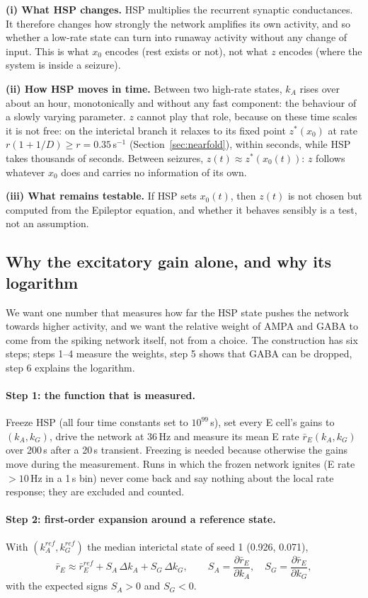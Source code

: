 \documentclass[11pt]{article}
\newcommand{\kA}{k_A}
\newcommand{\kG}{k_G}
\begin{document}
\textbf{(i) What HSP changes.} HSP multiplies the recurrent synaptic conductances. It therefore changes how strongly the
network amplifies its own activity, and so whether a low-rate state can turn into runaway activity without any change
of input. This is what $x_0$ encodes (rest exists or not), not what $z$ encodes (where the system is inside a seizure).

\textbf{(ii) How HSP moves in time.} Between two high-rate states, $\kA$ rises over about an hour, monotonically and
without any fast component: the behaviour of a slowly varying parameter. $z$ cannot play that role, because on these
time scales it is not free: on the interictal branch it relaxes to its fixed point $z^*(x_0)$ at rate $r(1+1/D)\ge r =
0.35$\,s$^{-1}$ (Section~\ref{sec:nearfold}), within seconds, while HSP takes thousands of seconds. Between seizures,
$z(t)\approx z^*(x_0(t))$: $z$ follows whatever $x_0$ does and carries no information of its own.

\textbf{(iii) What remains testable.} If HSP sets $x_0(t)$, then $z(t)$ is not chosen but computed from the Epileptor
equation, and whether it behaves sensibly is a test, not an assumption.

\subsection{Why the excitatory gain alone, and why its logarithm}\label{sec:Hderiv}
We want one number that measures how far the HSP state pushes the network towards higher activity, and we want the
relative weight of AMPA and GABA to come from the spiking network itself, not from a choice. The construction has six
steps; steps 1--4 measure the weights, step 5 shows that GABA can be dropped, step 6 explains the logarithm.

\paragraph{Step 1: the function that is measured.}
Freeze HSP (all four time constants set to $10^{99}$\,s), set every E cell's gains to $(\kA,\kG)$, drive the network at
36\,Hz and measure its mean E rate $\bar r_E(\kA,\kG)$ over 200\,s after a 20\,s transient. Freezing is needed because
otherwise the gains move during the measurement. Runs in which the frozen network ignites (E rate $>10$\,Hz in a 1\,s
bin) never come back and say nothing about the local rate response; they are excluded and counted.

\paragraph{Step 2: first-order expansion around a reference state.}
With $(\kA^{ref},\kG^{ref})$ the median interictal state of seed 1 (0.926, 0.071),
\[
\bar r_E \approx \bar r_E^{ref} + S_A\,\Delta\kA + S_G\,\Delta\kG,\qquad
S_A = \frac{\partial\bar r_E}{\partial\kA},\quad S_G = \frac{\partial\bar r_E}{\partial\kG},
\]
with the expected signs $S_A>0$ and $S_G<0$.
\end{document}
